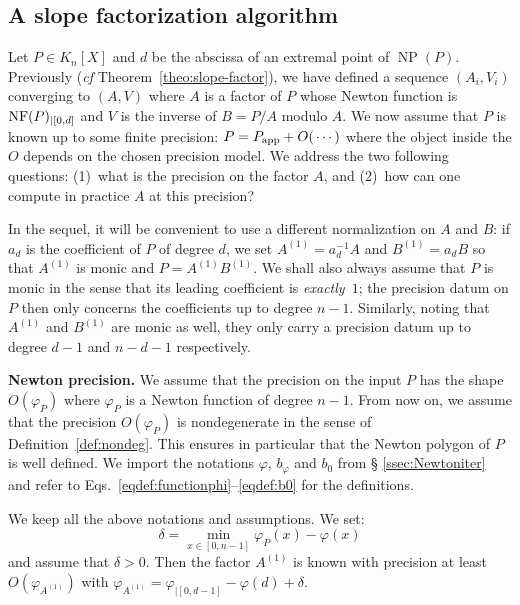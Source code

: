 \documentclass{sig-alternate-05-2015}
\DeclareMathOperator{\NP}{NP}
\newcommand{\NF}{\text{\rm NF}}
\newcommand{\app}{\textrm{app}}
\begin{document}
\subsection{A slope factorization algorithm}

Let $P \in K_n[X]$ and $d$ be the abscissa of an extremal point of 
$\NP(P)$. Previously (\emph{cf} Theorem~\ref{theo:slope-factor}), we 
have defined a sequence $(A_i, V_i)$ converging to $(A,V)$ where $A$ is 
a factor of $P$ whose Newton function is $\NF(P)_{|[0,d]}$ and $V$ is the inverse of $B = P/A$ modulo $A$.
We now assume that $P$ is known up to some finite precision: $P = P_\app + 
O(\hspace{0.5mm}\cdots)$ where the object inside the $O$ depends on the 
chosen precision model. We address the two following questions:
(1)~what is the precision on the factor $A$, and
(2)~how can one compute in practice $A$ at this precision?

In the sequel, it will be convenient to use a different normalization on 
$A$ and $B$: if $a_d$ is the coefficient of $P$ of degree $d$, we set
$A^{(1)} = a_d^{-1} A$ and $B^{(1)} = a_d B$
so that $A^{(1)}$ is monic and $P = A^{(1)} B^{(1)}$. We shall also 
always assume that $P$ is monic in the sense that its leading
coefficient is \emph{exactly}~$1$; the precision datum on $P$ then 
only concerns the coefficients up to degree $n{-}1$. Similarly, noting
that $A^{(1)}$ and $B^{(1)}$ are monic as well, they only carry a
precision datum up to degree $d{-}1$ and $n{-}d{-}1$ respectively.

\medskip

\noindent
{\bf Newton precision.}
We assume that the precision on the input $P$ has the shape 
$O(\varphi_P)$ where $\varphi_P$ is a Newton function of degree 
$n{-}1$. From now on, we assume that the precision $O(\varphi_P)$ 
is nondegenerate in the sense of Definition~\ref{def:nondeg}. This
ensures in particular that the Newton polygon of $P$ is well defined. 
We import the notations $\varphi$, $b_\varphi$ and $b_0$ from \S 
\ref{ssec:Newtoniter} and refer to 
Eqs.~\eqref{eqdef:functionphi}--\eqref{eqdef:b0} for the definitions.

\begin{prop}
\label{prop:Newtonprecslope}
We keep all the above notations and assumptions. We set:
$$\delta = \min_{x \in [0,n{-}1]} \varphi_P(x) - \varphi(x)$$
and assume that $\delta > 0$. 
Then the factor $A^{(1)}$ is known with precision at least 
$O(\varphi_{A^{(1)}})$ with
$\varphi_{A^{(1)}} = \varphi_{|[0,d{-}1]} - \varphi(d) + \delta$.
\end{prop}
\end{document}
